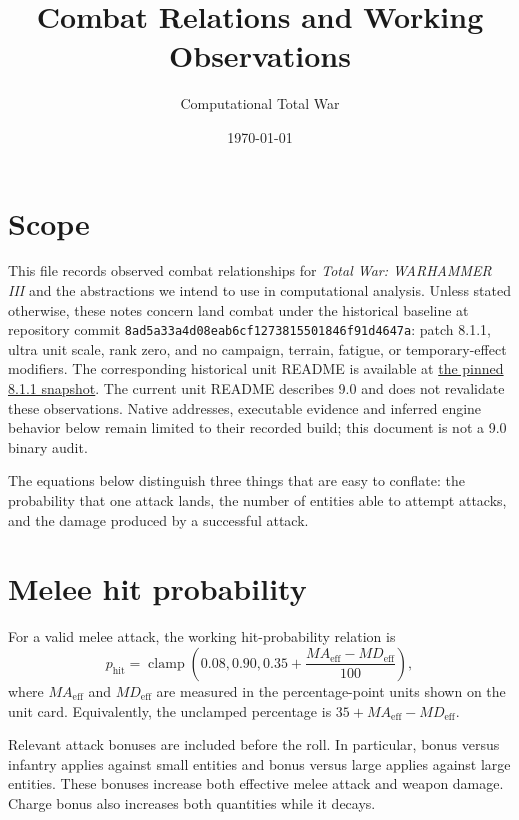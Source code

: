 \documentclass[11pt]{article}
\title{Combat Relations and Working Observations}
\author{Computational Total War}
\date{\today}
\begin{document}
\maketitle

\section{Scope}

This file records observed combat relationships for \emph{Total War:
WARHAMMER III} and the abstractions we intend to use in computational
analysis.  Unless stated otherwise, these notes concern land combat under the
historical baseline at repository commit
\texttt{8ad5a33a4d08eab6cf1273815501846f91d4647a}: patch 8.1.1, ultra
unit scale, rank zero, and no campaign, terrain, fatigue, or temporary-effect
modifiers. The corresponding historical unit README is available at
\href{https://github.com/OwenTanzer/computational-total-war/blob/8ad5a33a4d08eab6cf1273815501846f91d4647a/data/unit_stats/README.md}{the pinned 8.1.1 snapshot}.
The current unit README describes 9.0 and does not revalidate these observations.
Native addresses, executable evidence and inferred engine behavior below remain
limited to their recorded build; this document is not a 9.0 binary audit.

The equations below distinguish three things that are easy to conflate:
the probability that one attack lands, the number of entities able to attempt
attacks, and the damage produced by a successful attack.

\section{Melee hit probability}

For a valid melee attack, the working hit-probability relation is
\begin{equation}
  p_{\mathrm{hit}}
  = \operatorname{clamp}\!\left(
      0.08,
      0.90,
      0.35 + \frac{MA_{\mathrm{eff}}-MD_{\mathrm{eff}}}{100}
    \right),
  \label{eq:hit-probability}
\end{equation}
where $MA_{\mathrm{eff}}$ and $MD_{\mathrm{eff}}$ are measured in the
percentage-point units shown on the unit card.  Equivalently, the unclamped
percentage is $35 + MA_{\mathrm{eff}}-MD_{\mathrm{eff}}$.

Relevant attack bonuses are included before the roll.  In particular, bonus
versus infantry applies against small entities and bonus versus large applies
against large entities.  These bonuses increase both effective melee attack
and weapon damage.  Charge bonus also increases both quantities while it
decays.
\end{document}
